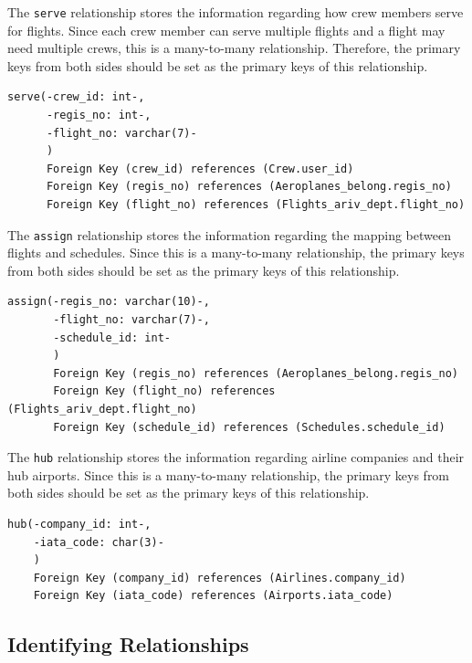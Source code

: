 \documentclass{article}
\begin{document}
	\noindent The \texttt{serve} relationship stores the information regarding how crew members serve for flights. Since each crew member can serve multiple flights and a flight may need multiple crews, this is a many-to-many relationship. Therefore, the primary keys from both sides should be set as the primary keys of this relationship.
	\begin{lstlisting}[keepspaces=true]        
serve(-crew_id: int-, 
      -regis_no: int-, 
      -flight_no: varchar(7)-
      )
      Foreign Key (crew_id) references (Crew.user_id)
      Foreign Key (regis_no) references (Aeroplanes_belong.regis_no)
      Foreign Key (flight_no) references (Flights_ariv_dept.flight_no)
	\end{lstlisting}    

	\noindent The \texttt{assign} relationship stores the information regarding the mapping between flights and schedules. Since this is a many-to-many relationship, the primary keys from both sides should be set as the primary keys of this relationship.
	\begin{lstlisting}[keepspaces=true]		
assign(-regis_no: varchar(10)-,
       -flight_no: varchar(7)-,
       -schedule_id: int-
       )
       Foreign Key (regis_no) references (Aeroplanes_belong.regis_no)
       Foreign Key (flight_no) references (Flights_ariv_dept.flight_no)
       Foreign Key (schedule_id) references (Schedules.schedule_id)
	\end{lstlisting}    
	
	\noindent The \texttt{hub} relationship stores the information regarding airline companies and their hub airports. Since this is a many-to-many relationship, the primary keys from both sides should be set as the primary keys of this relationship.
	\begin{lstlisting}[keepspaces=true]	
hub(-company_id: int-,
    -iata_code: char(3)-
    )
    Foreign Key (company_id) references (Airlines.company_id)
    Foreign Key (iata_code) references (Airports.iata_code)
	\end{lstlisting}    
	
	\subsection{Identifying Relationships}
	
\end{document}
